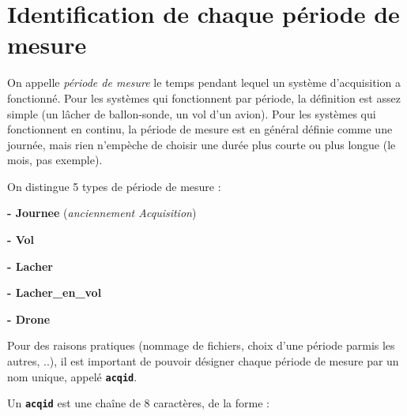 \section{Identification de chaque période de mesure}
\label{sec:AcqId}
   On appelle \textit{période de mesure} le temps pendant lequel
un système d'acquisition a fonctionné. Pour les systèmes qui
fonctionnent par période, la définition est assez simple (un 
lâcher de ballon-sonde, un vol d'un avion). Pour les systèmes qui
fonctionnent en continu, la période de mesure est en général
définie comme une journée, mais rien n'empèche  de choisir une
durée plus courte ou plus longue (le mois, pas exemple).

\medbreak
On distingue 5 types de période de mesure :

\textbf{- Journee} (\textit{anciennement Acquisition})

\textbf{- Vol}

\textbf{- Lacher}

\textbf{- Lacher\_en\_vol}

\textbf{- Drone}


\medbreak
   Pour des raisons pratiques (nommage de fichiers, choix d'une
période parmis les autres, ..), il est important de pouvoir désigner
chaque période de mesure par un nom unique, appelé \textbf{\texttt{acqid}}.

\medbreak
Un \textbf{\texttt{acqid}} est une chaîne de 8 caractères, de la forme : \\
\begin{center}
{}
\end{center}

